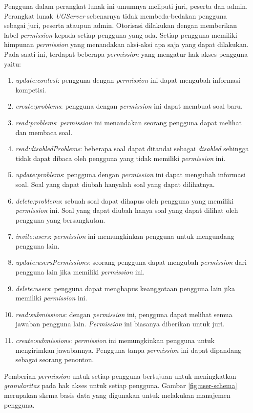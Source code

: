 Pengguna dalam perangkat lunak ini umumnya meliputi juri, peserta dan admin. Perangkat lunak \textit{UGServer} sebenarnya tidak membeda-bedakan pengguna sebagai juri, peserta ataupun admin. Otorisasi dilakukan dengan memberikan label \textit{permission} kepada setiap pengguna yang ada. Setiap pengguna memiliki himpunan \textit{permission} yang menandakan aksi-aksi apa saja yang dapat dilakukan. Pada saati ini, terdapat beberapa \textit{permission} yang mengatur hak akses pengguna yaitu:
\begin{enumerate}
    \item \textit{update:contest}: pengguna dengan \textit{permission} ini dapat mengubah informasi kompetisi.
    \item \textit{create:problems}: pengguna dengan \textit{permission} ini dapat membuat soal baru.
    \item \textit{read:problems}: \textit{permission} ini menandakan seorang pengguna dapat melihat dan membaca soal.
    \item \textit{read:disabledProblems}: beberapa soal dapat ditandai sebagai \textit{disabled} sehingga tidak dapat dibaca oleh pengguna yang tidak memiliki \textit{permission} ini.
    \item \textit{update:problems}: pengguna dengan \textit{permission} ini dapat mengubah informasi soal. Soal yang dapat diubah hanyalah soal yang dapat dilihatnya.
    \item \textit{delete:problems}: sebuah soal dapat dihapus oleh pengguna yang memiliki \textit{permission} ini. Soal yang dapat diubah hanya soal yang dapat dilihat oleh pengguna yang bersangkutan.
    \item \textit{invite:users}: \textit{permission} ini memungkinkan pengguna untuk mengundang pengguna lain.
    \item \textit{update:usersPermissions}: seorang pengguna dapat mengubah \textit{permission} dari pengguna lain jika memiliki \textit{permission} ini.
    \item \textit{delete:users}: pengguna dapat menghapus keanggotaan pengguna lain jika memiliki \textit{permission} ini.
    \item \textit{read:submissions}: dengan \textit{permission} ini, pengguna dapat melihat semua jawaban pengguna lain. \textit{Permission} ini biasanya diberikan untuk juri.
    \item \textit{create:submissions}: \textit{permission} ini memungkinkan pengguna untuk mengirimkan jawabannya. Pengguna tanpa \textit{permission} ini dapat dipandang sebagai seorang penonton.
\end{enumerate}
Pemberian \textit{permission} untuk setiap pengguna bertujuan untuk meningkatkan \textit{granularitas} pada hak akses untuk setiap pengguna. Gambar \ref{fig:user-schema} merupakan skema basis data yang digunakan untuk melakukan manajemen pengguna.

